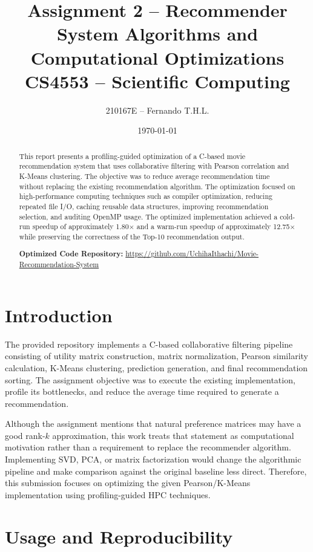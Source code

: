 \documentclass[11pt]{article}
\title{\textbf{Assignment 2 -- Recommender System Algorithms and Computational Optimizations}\\
\large CS4553 -- Scientific Computing}
\author{210167E -- Fernando T.H.L.}
\date{\today}
\begin{document}
\maketitle

\begin{abstract}
This report presents a profiling-guided optimization of a C-based movie recommendation system that uses collaborative filtering with Pearson correlation and K-Means clustering. The objective was to reduce average recommendation time without replacing the existing recommendation algorithm. The optimization focused on high-performance computing techniques such as compiler optimization, reducing repeated file I/O, caching reusable data structures, improving recommendation selection, and auditing OpenMP usage. The optimized implementation achieved a cold-run speedup of approximately 1.80$\times$ and a warm-run speedup of approximately 12.75$\times$ while preserving the correctness of the Top-10 recommendation output.

\noindent \textbf{Optimized Code Repository:}
\url{https://github.com/UchihaIthachi/Movie-Recommendation-System}
\end{abstract}

\section{Introduction}

The provided repository implements a C-based collaborative filtering pipeline consisting of utility matrix construction, matrix normalization, Pearson similarity calculation, K-Means clustering, prediction generation, and final recommendation sorting. The assignment objective was to execute the existing implementation, profile its bottlenecks, and reduce the average time required to generate a recommendation.

Although the assignment mentions that natural preference matrices may have a good rank-$k$ approximation, this work treats that statement as computational motivation rather than a requirement to replace the recommender algorithm. Implementing SVD, PCA, or matrix factorization would change the algorithmic pipeline and make comparison against the original baseline less direct. Therefore, this submission focuses on optimizing the given Pearson/K-Means implementation using profiling-guided HPC techniques.

\section{Usage and Reproducibility}
\end{document}
